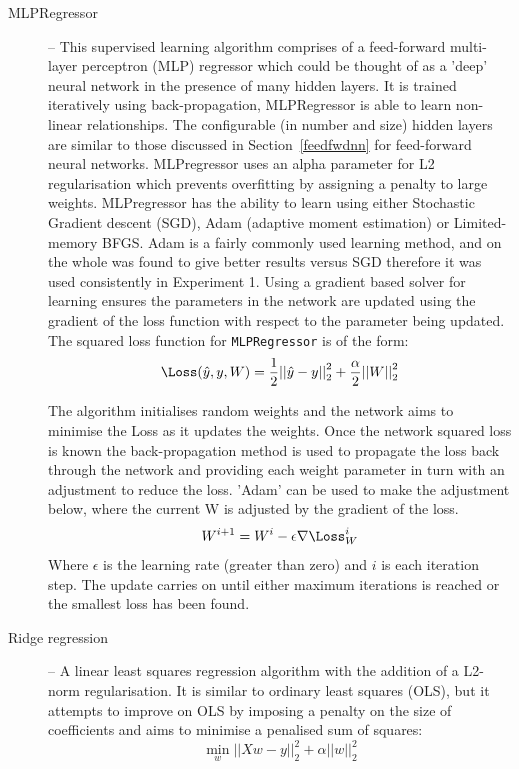 \begin{description}
    \item[MLPRegressor] -- This supervised learning algorithm comprises of a feed-forward multi-layer perceptron (MLP) regressor which could be thought of as a 'deep' neural network in the presence of many hidden layers. It is trained iteratively using back-propagation, MLPRegressor is able to learn non-linear relationships. The configurable (in number and size) hidden layers are similar to those discussed in Section~\ref{feedfwdnn} for feed-forward neural networks. MLPregressor uses an alpha parameter for L2 regularisation which prevents overfitting by assigning a penalty to large weights. MLPregressor has the ability to learn using either Stochastic Gradient descent (SGD), Adam (adaptive moment estimation) or Limited-memory BFGS. Adam is a fairly commonly used learning method, and on the whole was found to give better results versus SGD therefore it was used consistently in Experiment 1. Using a gradient based solver for learning ensures the parameters in the network are updated using the gradient of the loss function with respect to the parameter being updated. The squared loss function for \texttt{MLPRegressor} is of the form:
    \begin{equation}
    \Loss (\hat{y},y,W) = \dfrac{1}{2} {|| \hat{y}-y ||}_{2}^{2} + \dfrac{\alpha}{2} {|| W ||}_{2}^{2}
    \end{equation}

    The algorithm initialises random weights and the network aims to minimise the Loss as it updates the weights. Once the network squared loss is known the back-propagation method is used to propagate the loss back through the network and providing each weight parameter in turn with an adjustment to reduce the loss. 'Adam' can be used to make the adjustment below, where the current W is adjusted by the gradient of the loss.
    \begin{equation}
         W^{i+1} = W^{i} - \epsilon \nabla \Loss_{W}^{i}
    \end{equation}
    Where $\epsilon$ is the learning rate (greater than zero) and $i$ is each iteration step. The update carries on until either maximum iterations is reached or the smallest loss has been found.
    \item[Ridge regression] -- A linear least squares regression algorithm with the addition of a L2-norm regularisation. It is similar to ordinary least squares (OLS), but it attempts to improve on OLS by imposing a penalty on the size of coefficients and aims to minimise a penalised sum of squares:
    \begin{equation}
        \min_w {|| Xw-y ||}_{2}^{2} + \alpha {|| w ||}_{2}^{2}
    \end{equation}


\end{description}
